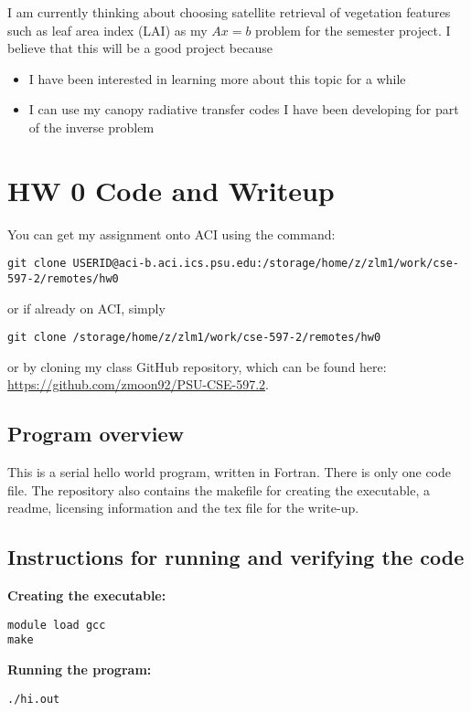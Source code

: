 \documentclass{article}
\begin{document}
\begin{spacing}{1.1}
I am currently thinking about choosing satellite retrieval of vegetation features such as leaf area index (LAI) as my $Ax=b$ problem for the semester project. I believe that this will be a good project because
\begin{itemize}
  \item I have been interested in learning more about this topic for a while
  \item I can use my canopy radiative transfer codes I have been developing for part of the inverse problem
\end{itemize}


\section{HW 0 Code and Writeup}

You can get my assignment onto ACI using the command:
\begin{verbatim}
git clone USERID@aci-b.aci.ics.psu.edu:/storage/home/z/zlm1/work/cse-597-2/remotes/hw0
\end{verbatim}
or if already on ACI, simply
\begin{verbatim}
git clone /storage/home/z/zlm1/work/cse-597-2/remotes/hw0
\end{verbatim}
or by cloning my class GitHub repository, which can be found here: \url{https://github.com/zmoon92/PSU-CSE-597.2}. 


\subsection{Program overview}

This is a serial hello world program, written in Fortran. There is only one code file. The repository also contains the makefile for creating the executable, a readme, licensing information and the tex file for the write-up.


\subsection{Instructions for running and verifying the code}

\textbf{Creating the executable:}
\begin{verbatim}
module load gcc
make
\end{verbatim}

\textbf{Running the program:}
\begin{verbatim}
./hi.out
\end{verbatim}


\end{spacing}
\end{document}

